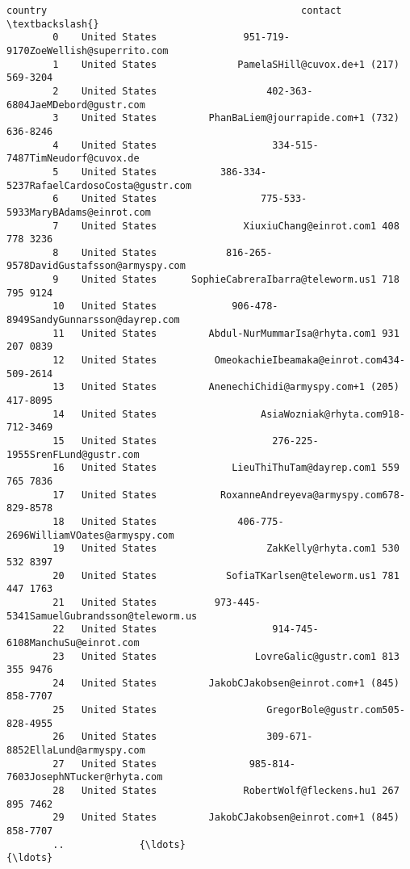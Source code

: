 \documentclass[11pt]{article}
\begin{document}
\begin{Verbatim}[commandchars=\\\{\}]
                   country                                            contact  \textbackslash{}
        0    United States               951-719-9170ZoeWellish@superrito.com   
        1    United States              PamelaSHill@cuvox.de+1 (217) 569-3204   
        2    United States                   402-363-6804JaeMDebord@gustr.com   
        3    United States         PhanBaLiem@jourrapide.com+1 (732) 636-8246   
        4    United States                    334-515-7487TimNeudorf@cuvox.de   
        5    United States           386-334-5237RafaelCardosoCosta@gustr.com   
        6    United States                  775-533-5933MaryBAdams@einrot.com   
        7    United States               XiuxiuChang@einrot.com1 408 778 3236   
        8    United States            816-265-9578DavidGustafsson@armyspy.com   
        9    United States      SophieCabreraIbarra@teleworm.us1 718 795 9124   
        10   United States             906-478-8949SandyGunnarsson@dayrep.com   
        11   United States         Abdul-NurMummarIsa@rhyta.com1 931 207 0839   
        12   United States          OmeokachieIbeamaka@einrot.com434-509-2614   
        13   United States         AnenechiChidi@armyspy.com+1 (205) 417-8095   
        14   United States                  AsiaWozniak@rhyta.com918-712-3469   
        15   United States                    276-225-1955SrenFLund@gustr.com   
        16   United States             LieuThiThuTam@dayrep.com1 559 765 7836   
        17   United States           RoxanneAndreyeva@armyspy.com678-829-8578   
        18   United States              406-775-2696WilliamVOates@armyspy.com   
        19   United States                   ZakKelly@rhyta.com1 530 532 8397   
        20   United States            SofiaTKarlsen@teleworm.us1 781 447 1763   
        21   United States          973-445-5341SamuelGubrandsson@teleworm.us   
        22   United States                    914-745-6108ManchuSu@einrot.com   
        23   United States                 LovreGalic@gustr.com1 813 355 9476   
        24   United States         JakobCJakobsen@einrot.com+1 (845) 858-7707   
        25   United States                   GregorBole@gustr.com505-828-4955   
        26   United States                   309-671-8852EllaLund@armyspy.com   
        27   United States                985-814-7603JosephNTucker@rhyta.com   
        28   United States               RobertWolf@fleckens.hu1 267 895 7462   
        29   United States         JakobCJakobsen@einrot.com+1 (845) 858-7707   
        ..             {\ldots}                                                {\ldots}   

\end{Verbatim}
\end{document}
